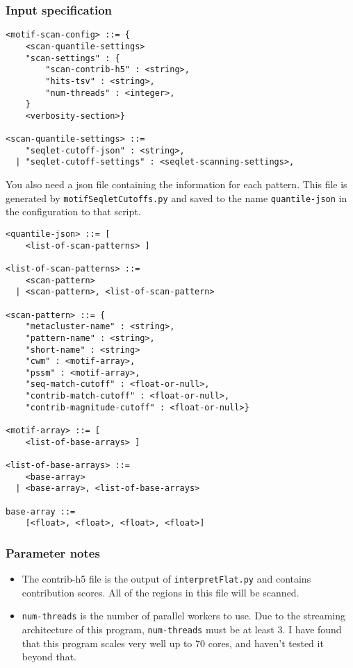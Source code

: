 \documentclass{article}
\begin{document}
\subsubsection{Input specification}

\begin{lstlisting}
<motif-scan-config> ::= {
    <scan-quantile-settings>
    "scan-settings" : {
        "scan-contrib-h5" : <string>,
        "hits-tsv" : <string>,
        "num-threads" : <integer>,
    }
    <verbosity-section>}

<scan-quantile-settings> ::=
    "seqlet-cutoff-json" : <string>,
  | "seqlet-cutoff-settings" : <seqlet-scanning-settings>,
\end{lstlisting}

You also need a json file containing the information for each pattern.
This file is generated by \texttt{motifSeqletCutoffs.py} and saved to the name
\texttt{quantile-json} in the configuration to that script.

\begin{lstlisting}
<quantile-json> ::= [
    <list-of-scan-patterns> ]

<list-of-scan-patterns> ::= 
    <scan-pattern>
  | <scan-pattern>, <list-of-scan-pattern>

<scan-pattern> ::= {
    "metacluster-name" : <string>,
    "pattern-name" : <string>,
    "short-name" : <string>
    "cwm" : <motif-array>,
    "pssm" : <motif-array>,
    "seq-match-cutoff" : <float-or-null>,
    "contrib-match-cutoff" : <float-or-null>,
    "contrib-magnitude-cutoff" : <float-or-null>}

<motif-array> ::= [
    <list-of-base-arrays> ]

<list-of-base-arrays> ::= 
    <base-array>
  | <base-array>, <list-of-base-arrays>

base-array ::= 
    [<float>, <float>, <float>, <float>]
\end{lstlisting}


\subsubsection{Parameter notes}
\begin{itemize}
    \item The contrib-h5 file is the output of \texttt{interpretFlat.py} and contains
        contribution scores.
        All of the regions in this file will be scanned.
    \item \texttt{num-threads} is the number of parallel workers to use.
        Due to the streaming architecture of this program, \texttt{num-threads}
        must be at least 3.
        I have found that this program scales very well up to 70 cores,
        and haven't tested it beyond that.
\end{itemize}
\end{document}
